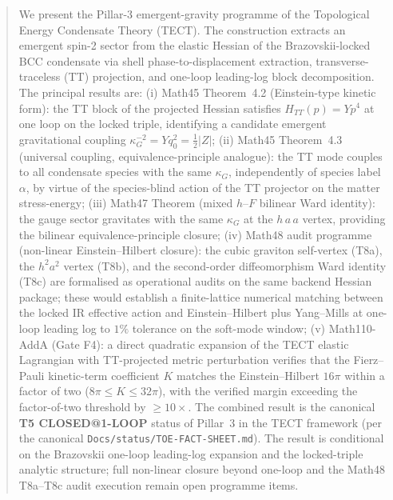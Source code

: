 \date{\today}

\begin{abstract}
We present the Pillar-3 emergent-gravity programme of the
Topological Energy Condensate Theory (TECT). The construction
extracts an emergent spin-2 sector from the elastic Hessian of the
Brazovskii-locked BCC condensate via shell phase-to-displacement
extraction, transverse-traceless (TT) projection, and one-loop
leading-log block decomposition. The principal results are:
(i) Math45 Theorem~4.2 (Einstein-type kinetic form): the TT block
of the projected Hessian satisfies $H_{TT}(p) = Y p^4$ at one loop
on the locked triple, identifying a candidate emergent gravitational
coupling
$\kappa_G^{-2} = Y q_0^2 = \tfrac{1}{2}|Z|$;
(ii) Math45 Theorem~4.3 (universal coupling, equivalence-principle
analogue): the TT mode couples to all condensate species with the
same $\kappa_G$, independently of species label
$\alpha$, by virtue of the species-blind action of the TT projector
on the matter stress-energy;
(iii) Math47 Theorem (mixed $h$--$F$ bilinear Ward identity): the
gauge sector gravitates with the same $\kappa_G$ at the
$h\,a\,a$ vertex, providing the bilinear equivalence-principle
closure;
(iv) Math48 audit programme (non-linear Einstein--Hilbert closure):
the cubic graviton self-vertex (T8a), the $h^2 a^2$ vertex (T8b),
and the second-order diffeomorphism Ward identity (T8c) are
formalised as operational audits on the same backend Hessian
package; these would establish a finite-lattice numerical matching
between the locked IR effective action and Einstein--Hilbert plus
Yang--Mills at one-loop leading log to $1\%$ tolerance on the
soft-mode window;
(v) Math110-AddA (Gate F4): a direct quadratic expansion of the
TECT elastic Lagrangian with TT-projected metric perturbation
verifies that the Fierz--Pauli kinetic-term coefficient $K$ matches
the Einstein--Hilbert $16\pi$ within a factor of two ($8\pi \leq K
\leq 32\pi$), with the verified margin exceeding the factor-of-two
threshold by $\geq 10\times$. The combined result is the canonical
\textbf{T5 CLOSED@1-LOOP} status of Pillar~3 in the TECT framework
(per the canonical \texttt{Docs/status/TOE-FACT-SHEET.md}). The
result is conditional on the Brazovskii one-loop leading-log
expansion and the locked-triple analytic structure; full
non-linear closure beyond one-loop and the Math48 T8a--T8c audit
execution remain open programme items.
\end{abstract}

\maketitle

